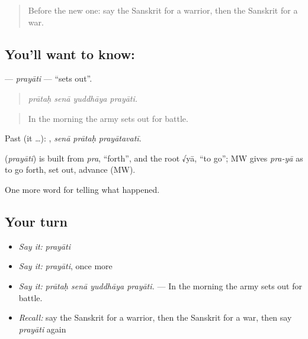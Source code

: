 \begin{quote}
Before the new one: say the Sanskrit for a warrior, then the Sanskrit for a war.
\end{quote}

\subsection*{You'll want to know: }
\textbf{} — \emph{prayāti} — \textquotedblleft{}sets out\textquotedblright{}.

\begin{quote}
   
\end{quote}

\begin{quote}
\emph{prātaḥ senā yuddhāya prayāti.}
\end{quote}

\begin{quote}
In the morning the army sets out for battle.
\end{quote}

Past (it …):   , \emph{senā prātaḥ prayātavatī}.

\begin{cousinweb}
\textbf{} (\emph{prayāti}) is built from \emph{pra}, \textquotedblleft{}forth\textquotedblright{}, and the root √yā, \textquotedblleft{}to go\textquotedblright{}; MW gives \emph{pra-yā} as to go forth, set out, advance (MW).
\end{cousinweb}

\begin{grammarlens}[title={What you've built}]
One more word for telling what happened.
\end{grammarlens}

\subsection*{Your turn}
\begin{itemize}
\raggedright
  \item \emph{Say it:} \emph{prayāti}
  \item \emph{Say it:} \emph{prayāti}, once more
  \item \emph{Say it:} \emph{prātaḥ senā yuddhāya prayāti.} — In the morning the army sets out for battle.
  \item \emph{Recall:} say the Sanskrit for a warrior, then the Sanskrit for a war, then say \emph{prayāti} again
\end{itemize}

